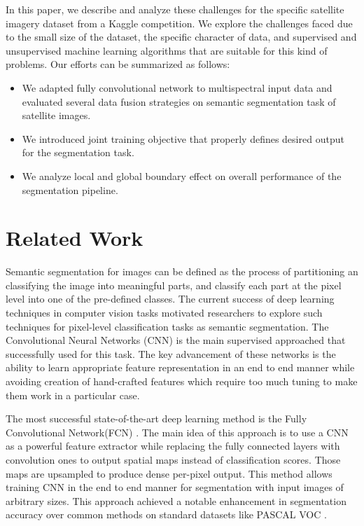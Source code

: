 \documentclass[10pt,twocolumn,letterpaper]{article}
\begin{document}
In this paper, we describe and analyze these challenges for the specific satellite imagery dataset from a Kaggle competition.  We explore the challenges faced due to the small size of the dataset, the specific character of data, and supervised and unsupervised machine learning algorithms that are suitable for this kind of problems. Our efforts  can be summarized as follows: 
\begin{itemize}
\item We adapted fully convolutional network to multispectral input data and evaluated several data fusion strategies on semantic segmentation task of satellite images. 

\item We introduced joint training objective that properly defines desired output for the segmentation task.

\item We analyze local and global boundary effect on overall performance of the segmentation pipeline. 

\end{itemize} 


\section{Related Work}
\label{section:related_work}
Semantic segmentation for images can be defined as the process of partitioning an classifying the image into meaningful parts, and classify each part at the pixel level into one of the pre-defined classes. The current success of deep learning techniques in computer vision tasks motivated researchers to explore such techniques for pixel-level classification tasks as semantic segmentation. The Convolutional Neural Networks (CNN) is the main supervised approached that successfully used for this task. The key advancement of these networks is the ability to learn appropriate feature representation in an end to end manner while avoiding creation of hand-crafted features which require too much tuning to make them work in a particular case.    

The most successful state-of-the-art deep learning method is the Fully Convolutional Network(FCN) \cite{fcn}.  The main idea of this approach is to use a CNN as a powerful feature extractor while replacing the fully connected layers with convolution ones to output spatial maps instead of classification scores. Those maps are upsampled to produce dense per-pixel output. This method allows training CNN in the end to end manner for segmentation with input images of arbitrary sizes. This approach achieved a notable enhancement in segmentation accuracy over common methods on standard datasets like PASCAL VOC \cite{pascal}.
\end{document}
